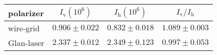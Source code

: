 \begin{tabular}{lccc}
\toprule
polarizer  & $I_\text{v} (10^6)$
                               & $I_\text{h} (10^6)$
															                     & $I_\text{v} / I_\text{h}$
																									                     \\
\midrule
wire-grid  & $0.906 \pm 0.022$ & $0.832 \pm 0.018$ & $1.089 \pm 0.003$ \\
Glan-laser & $2.337 \pm 0.012$ & $2.349 \pm 0.123$ & $0.997 \pm 0.053$ \\
\bottomrule
\end{tabular}
